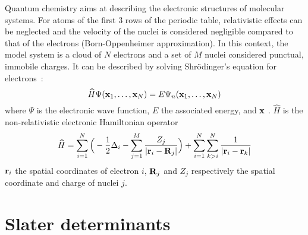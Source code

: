 \documentclass[./thesis.tex]{subfiles}
\begin{document}
Quantum chemistry aims at describing the electronic structures of molecular systems.
For atoms of the first 3 rows of the periodic table, relativistic effects can be neglected and the velocity of the nuclei is considered negligible compared to that of the electrons (Born-Oppenheimer approximation). In this context, the model system is a cloud of $N$ electrons and a set of $M$ nuclei considered punctual, immobile charges. It can be described by solving Shrödinger's equation for electrons~:
\begin{equation}
 \widehat{H} \Psi({\bf x}_1,\dots,{\bf x}_N) = E \Psi_n({\bf x}_1,\dots,{\bf x}_N)
\end{equation}
where $\Psi$ is the electronic wave function, $E$ the associated energy, and $\bf x$ . $\widehat H$ is the non-relativistic electronic Hamiltonian operator
\begin{equation}
\widehat{H} = \sum_{i=1}^{N} \Big ( -\frac{1}{2} \Delta_i - \sum_{j=1}^M \frac{Z_j}{|{\bf r}_i - {\bf R}_j|} \Big ) + \sum_{i=1}^{N} \sum_{k>i}^{N} \frac{1}{|{\bf r}_i - {\bf r}_k|}
\end{equation}
${\bf r}_i$ the spatial coordinates of electron $i$, ${\bf R}_j$ and $Z_j$ respectively the spatial coordinate and charge of nuclei $j$.

\section{Slater determinants}
\end{document}
